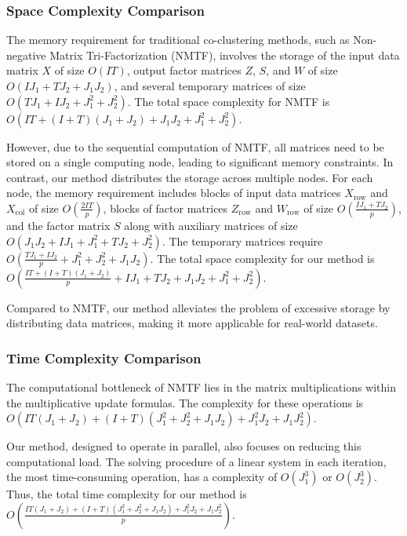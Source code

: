 \documentclass[journal]{IEEEtran}
\begin{document}
\subsubsection{Space Complexity Comparison}

The memory requirement for traditional co-clustering methods, such as Non-negative Matrix Tri-Factorization (NMTF), involves the storage of the input data matrix $X$ of size $O(IT)$, output factor matrices $Z$, $S$, and $W$ of size $O(IJ_1 + TJ_2 + J_1J_2)$, and several temporary matrices of size $O(TJ_1 + IJ_2 + J_1^2 + J_2^2)$. The total space complexity for NMTF is $O(IT + (I + T)(J_1 + J_2) + J_1J_2 + J_1^2 + J_2^2)$.

However, due to the sequential computation of NMTF, all matrices need to be stored on a single computing node, leading to significant memory constraints. In contrast, our method distributes the storage across multiple nodes. For each node, the memory requirement includes blocks of input data matrices $X_{\text{row}}$ and $X_{\text{col}}$ of size $O(\frac{2IT}{p})$, blocks of factor matrices $Z_{\text{row}}$ and $W_{\text{row}}$ of size $O(\frac{IJ_1 + TJ_2}{p})$, and the factor matrix $S$ along with auxiliary matrices of size $O(J_1J_2 + IJ_1 + J_1^2 + TJ_2 + J_2^2)$. The temporary matrices require $O(\frac{TJ_1 + IJ_2}{p} + J_1^2 + J_2^2 + J_1J_2)$. The total space complexity for our method is $O(\frac{IT + (I + T)(J_1 + J_2)}{p} + IJ_1 + TJ_2 + J_1J_2 + J_1^2 + J_2^2)$.

Compared to NMTF, our method alleviates the problem of excessive storage by distributing data matrices, making it more applicable for real-world datasets.

\subsubsection{Time Complexity Comparison}

The computational bottleneck of NMTF lies in the matrix multiplications within the multiplicative update formulas. The complexity for these operations is $O(IT(J_1 + J_2) + (I + T)(J_1^2 + J_2^2 + J_1J_2) + J_1^2J_2 + J_1J_2^2)$.

Our method, designed to operate in parallel, also focuses on reducing this computational load. The solving procedure of a linear system in each iteration, the most time-consuming operation, has a complexity of $O(J_1^3)$ or $O(J_2^3)$. Thus, the total time complexity for our method is $O(\frac{IT(J_1 + J_2) + (I + T)(J_1^2 + J_2^2 + J_1J_2) + J_1^2J_2 + J_1J_2^2}{p})$.
\end{document}
